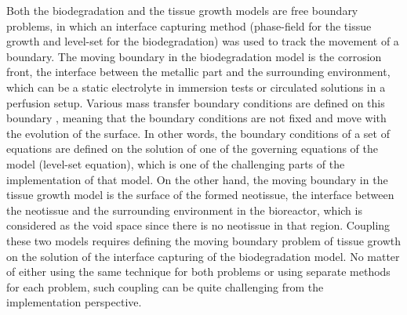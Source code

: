 Both the biodegradation and the tissue growth models are free boundary problems, in which an interface capturing method (phase-field for the tissue growth and level-set for the biodegradation) was used to track the movement of a boundary. The moving boundary in the biodegradation model is the corrosion front, the interface between the metallic part and the surrounding environment, which can be a static electrolyte in immersion tests or circulated solutions in a perfusion setup. Various mass transfer boundary conditions are defined on this boundary \cite{Barzegari2021}, meaning that the boundary conditions are not fixed and move with the evolution of the surface. In other words, the boundary conditions of a set of equations are defined on the solution of one of the governing equations of the model (level-set equation), which is one of the challenging parts of the implementation of that model. On the other hand, the moving boundary in the tissue growth model is the surface of the formed neotissue, the interface between the neotissue and the surrounding environment in the bioreactor, which is considered as the void space since there is no neotissue in that region. Coupling these two models requires defining the moving boundary problem of tissue growth on the solution of the interface capturing of the biodegradation model. No matter of either using the same technique for both problems or using separate methods for each problem, such coupling can be quite challenging from the implementation perspective.

